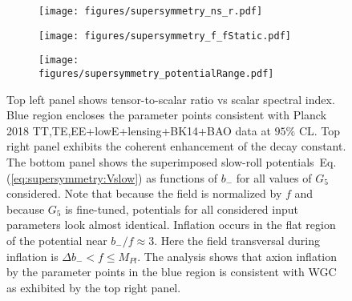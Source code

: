 \documentclass[12pt]{article}
\begin{document}
\begin{figure}
  \centering
  \begin{subfigure}{0.45 \textwidth}
    \texttt{[image: figures/supersymmetry\_ns\_r.pdf]}
  \end{subfigure}
  \begin{subfigure}{0.45 \textwidth}
    \texttt{[image: figures/supersymmetry\_f\_fStatic.pdf]}
  \end{subfigure}
  \begin{subfigure}{0.45 \textwidth}
    \texttt{[image: figures/supersymmetry\_potentialRange.pdf]}
  \end{subfigure}
  \caption{\protect
    Top left panel shows tensor-to-scalar ratio vs scalar spectral index.
    Blue region encloses the parameter points consistent with Planck 2018 TT,TE,EE+lowE+lensing+BK14+BAO data at $95\%$ CL.
    Top right panel exhibits the coherent enhancement of the decay constant.
    The bottom panel shows the superimposed slow-roll potentials~Eq.(\ref{eq:supersymmetry:Vslow}) as functions of $b_-$ for all values of $G_5$ considered.
    Note that because the field is normalized by $f$ and because $G_5$ is fine-tuned, potentials for all considered input parameters look almost identical.
    Inflation occurs in the flat region of the potential near $b_- / f \approx 3$.
    Here the field transversal during inflation is $\Delta b_- < f \le M_{Pl}$.
    The analysis shows that axion inflation by the parameter points in the blue region is consistent with WGC as exhibited by the top right panel.
  } \label{fig:supersymmetry}
\end{figure}
\end{document}
